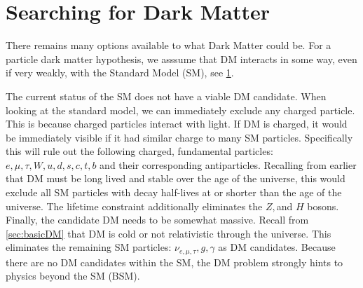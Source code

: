 \section{Searching for Dark Matter}\label{sec:dm_search}

There remains many options available to what Dark Matter could be.
For a particle dark matter hypothesis, we asssume that DM interacts in some way, even if very weakly, with the Standard Model (SM), see \cref{fig:SM}.
\begin{figure}[ht]
    \label{fig:SM}
\end{figure}
The current status of the SM does not have a viable DM candidate.
When looking at the standard model, we can immediately exclude any charged particle.
This is because charged particles interact with light.
If DM is charged, it would be immediately visible if it had similar charge to many SM particles.
Specifically this will rule out the following charged, fundamental particles: $e,\mu, \tau, W, u, d, s, c, t, b$ and their corresponding antiparticles.
Recalling from earlier that DM must be long lived and stable over the age of the universe, this would exclude all SM particles with decay half-lives at or shorter than the age of the universe.
The lifetime constraint additionally eliminates the $Z, $and $H$ bosons.
Finally, the candidate DM needs to be somewhat massive.
Recall from \cref{sec:basicDM} that DM is cold or not relativistic through the universe.
This eliminates the remaining SM particles: $\nu_{e, \mu, \tau}, g, \gamma$ as DM candidates.
Because there are no DM candidates within the SM, the DM problem strongly hints to physics beyond the SM (BSM).



